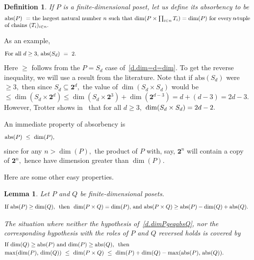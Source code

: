 \documentclass{amsart}
\newtheorem{lemma}[theorem]{Lemma}
\newtheorem{definition}[theorem]{Definition}
\numberwithin{equation}{section}
\numberwithin{theorem}{section}
\renewcommand{\r}{\mathrm}
\newcommand{\abs}{\r{abs}}
\newcommand{\2}{\mathbf{2}}
\begin{document}
\begin{definition}\label{D.abs}
If $P$ is a finite-dimensional poset, let us define its
{\em absorbency} to be
%
\begin{equation}\begin{minipage}[c]{35pc}\label{d.abs}
$\abs(P)\ =$ the largest natural number $n$ such that
$\dim(P\times\prod_{i\in n} T_i) = \dim(P)$ for every
$\!n\!$-tuple of chains $(T_i)_{i\in n}.$
\end{minipage}\end{equation}
%
\end{definition}
%
As an example,
%
\begin{equation}\begin{minipage}[c]{35pc}\label{d.absS_n}
For all $d\geq 3,$ $\abs(S_d)\ =\ 2.$
\end{minipage}\end{equation}
%
Here $\geq$ follows from the $P=S_d$ case of~\eqref{d.dim=d=dim}.
To get the reverse inequality, we will use a result from the literature.
Note that if $\abs(S_d)$ were $\geq 3,$ then since $S_d\subseteq \2^d,$
the value of $\dim(S_d\times S_d)$ would be
$\leq \dim(S_d\times \2^d)\leq \dim(S_d\times \2^3)+\dim(\2^{d-3})
= d+(d-3)=2d-3.$
However, Trotter shows in~\cite[Theorem~2]{Trotter89}
that for all $d\geq 3,$ $\dim(S_d\times\nolinebreak S_d)=2d-2.$

An immediate property of absorbency is
%
\begin{equation}\begin{minipage}[c]{35pc}\label{d.absleqdim}
$\abs(P)\ \leq\ \dim(P),$
\end{minipage}\end{equation}
%
since for any $n>\dim(P),$ the product of $P$ with, say, $\2^n$ will
contain a copy of $\2^n,$
hence have dimension greater than $\dim(P).$

Here are some other easy properties.

\begin{lemma}\label{L.abs}
Let $P$ and $Q$ be finite-dimensional posets.
%
\begin{equation}\begin{minipage}[c]{36pc}\label{d.dimPgeqabsQ}
If $\abs(P) \geq \dim(Q),$ \ then \ $\dim(P\times Q) = \dim(P),$
and $\abs(P\times Q) \geq \abs(P)-\dim(Q)+\abs(Q).$
\end{minipage}\end{equation}

The situation where neither the hypothesis of~\eqref{d.dimPgeqabsQ},
nor the corresponding hypothesis with the roles of
$P$ and $Q$ reversed holds is covered by
%
\begin{equation}\begin{minipage}[c]{35pc}\label{d.dimgeqabs}
If $\dim(Q) \geq \abs(P)$ and $\dim(P) \geq \abs(Q),$ \ then\\[.2em]
$\max(\dim(P),\,\dim(Q))\ \leq\ \dim(P\times Q)\ \leq\ %
\dim(P)+\dim(Q)-\max(\abs(P),\,\abs(Q)).$
\end{minipage}\end{equation}
%
\end{lemma}
\end{document}
